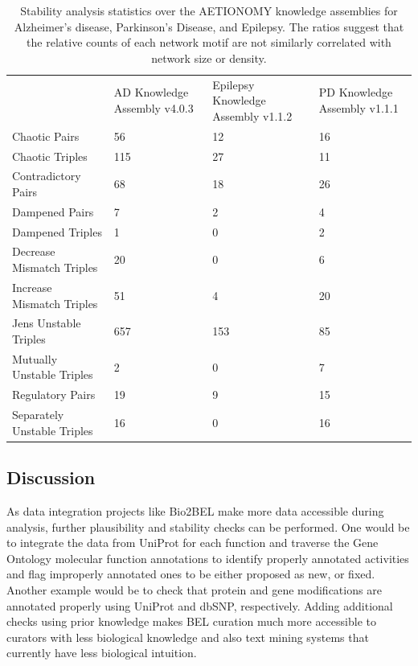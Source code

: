 \begin{table}
\centering
\caption[Stability Analysis of NeuroMMSig]{Stability analysis statistics over the AETIONOMY knowledge assemblies for Alzheimer's disease, Parkinson's Disease, and Epilepsy. The ratios suggest that the relative counts of each network motif are not similarly correlated with network size or density. }
\label{tab:stability}
\def\arraystretch{1.5}
\begin{tabular}{p{55mm} p{25mm} p{25mm} p{25mm}}
 & \ac{AD} Knowledge Assembly v4.0.3 & Epilepsy Knowledge Assembly v1.1.2 & \ac{PD} Knowledge Assembly v1.1.1 \\
Chaotic Pairs & 56 & 12 & 16 \\
Chaotic Triples & 115 & 27 & 11 \\
Contradictory Pairs & 68 & 18 & 26 \\
Dampened Pairs & 7 & 2 & 4 \\
Dampened Triples & 1 & 0 & 2 \\
Decrease Mismatch Triples & 20 & 0 & 6 \\
Increase Mismatch Triples & 51 & 4 & 20 \\
Jens Unstable Triples & 657 & 153 & 85 \\
Mutually Unstable Triples & 2 & 0 & 7 \\
Regulatory Pairs & 19 & 9 & 15 \\
Separately Unstable Triples & 16 & 0 & 16
\end{tabular}
\end{table}

\subsection{Discussion}

As data integration projects like Bio2BEL make more data accessible during analysis, further plausibility and stability checks can be performed. One would be to integrate the data from \ac{UniProt} for each function and traverse the Gene Ontology molecular function annotations to identify properly annotated activities and flag improperly annotated ones to be either proposed as new, or fixed. Another example would be to check that protein and gene modifications are annotated properly using \ac{UniProt} and dbSNP, respectively. Adding additional checks using prior knowledge makes \ac{BEL} curation much more accessible to curators with less biological knowledge and also text mining systems that currently have less biological intuition.


